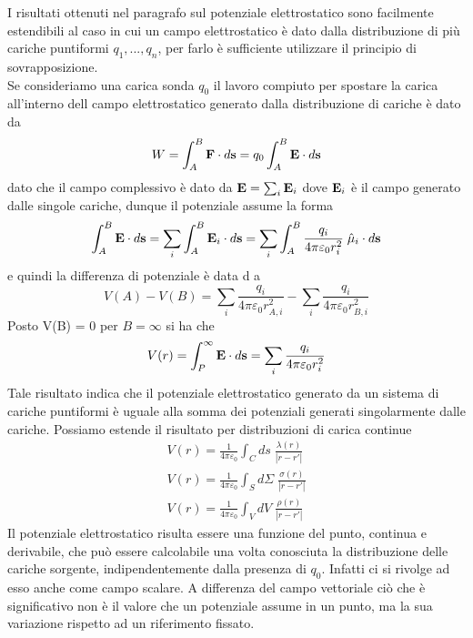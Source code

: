 I risultati ottenuti nel paragrafo sul potenziale elettrostatico sono facilmente estendibili al caso in cui un campo elettrostatico \`e dato dalla distribuzione di pi\`u cariche puntiformi $q_1,...,q_n$, per farlo \`e sufficiente utilizzare il principio di sovrapposizione.
\\
Se consideriamo una carica sonda $q_0$ il lavoro compiuto per spostare la carica all'interno dell campo elettrostatico generato dalla distribuzione di cariche \`e dato da 
\begin{equation*}
	W =\int_{A}^{B} \bold{F} \cdot d\bold{s} = q_0 \int_{A}^{B} \bold{E} \cdot d\bold{s}
\end{equation*}
dato che il campo complessivo \`e dato da $\bold{E} = \sum_{i} \bold{E}_i$ dove $\bold{E}_i$ \`e il campo generato dalle singole cariche, dunque il potenziale assume la forma
\begin{equation*}
	\int_{A}^{B}\bold{E} \cdot d \bold{s} = \sum_{i}\int_{A}^{B} \bold{E}_i \cdot d\bold{s} = \sum_{i} \int _{A}^{B} \frac{q_i}{4 \pi \varepsilon_0 r_i^2} \; \hat{\mu}_i \cdot d\bold{s}
\end{equation*}
e quindi la differenza di potenziale \`e data d a
\begin{equation*}
	V(A) - V(B) = \sum_{i}\frac{q_i}{4 \pi \varepsilon_0 r_{A,i}^2} - \sum_{i}\frac{q_i}{4 \pi \varepsilon_0 r_{B,i}^2} 
\end{equation*}
Posto V(B) = 0 per $B = \infty$ si ha che 
\begin{equation}
	V(r) = \int_{P}^{\infty} \bold{E}  \cdot d \bold{s} = \sum_{i}\frac{q_i}{4 \pi \varepsilon_0 r_{i}^2}
\end{equation}
Tale risultato indica che il potenziale elettrostatico generato da un sistema di cariche puntiformi \`e uguale alla somma dei potenziali generati singolarmente dalle cariche. Possiamo estende il risultato per distribuzioni di carica continue 
\begin{equation}
	\begin{aligned}
		& V(r) = \frac{1}{4 \pi \varepsilon_0}\int_{C} ds \; \frac{\lambda(r)}{|r-r'|} & \\[0.5cm]
		& V(r) = \frac{1}{4 \pi \varepsilon_0} \int_{S} d\Sigma \; \frac{\sigma (r)}{|r-r'|} & \\[0.5cm]
		& V(r) = \frac{1}{4 \pi \varepsilon_0} \int_{V}dV \;  \frac{\rho(r)}{|r-r'|} 
	\end{aligned}
\end{equation}
Il potenziale elettrostatico risulta essere una funzione del punto, continua e derivabile, che pu\`o essere calcolabile una volta conosciuta la distribuzione delle cariche sorgente, indipendentemente dalla presenza di $q_0$. Infatti ci si rivolge ad esso anche come campo scalare. A differenza del campo vettoriale ci\`o che \`e significativo non \`e il valore che un potenziale assume in un punto, ma la sua variazione rispetto ad un riferimento fissato.

